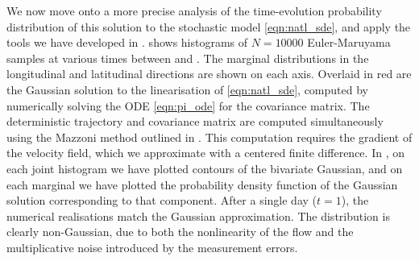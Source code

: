 We now move onto a more precise analysis of the time-evolution probability distribution of this solution to the stochastic model \cref{eqn:natl_sde}, and apply the tools we have developed in .
 shows histograms of \(N = 10000\) Euler-Maruyama samples at various times between  and .
The marginal distributions in the longitudinal and latitudinal directions are shown on each axis.
Overlaid in red are the Gaussian solution to the linearisation of \cref{eqn:natl_sde}, computed by numerically solving the ODE \cref{eqn:pi_ode} for the covariance matrix.
The deterministic trajectory and covariance matrix are computed simultaneously using the Mazzoni method outlined in .
This computation requires the gradient of the velocity field, which we approximate with a centered finite difference.
In , on each joint histogram we have plotted contours of the bivariate Gaussian, and on each marginal we have plotted the probability density function of the Gaussian solution corresponding to that component.
After a single day (\(t = 1\)), the numerical realisations match the Gaussian approximation.
The distribution is clearly non-Gaussian, due to both the nonlinearity of the flow and the multiplicative noise introduced by the measurement errors.



